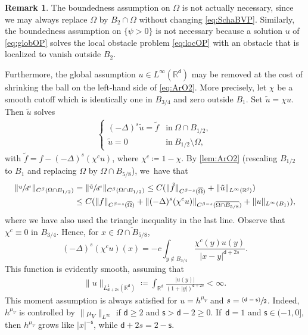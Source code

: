 \documentclass[JEP,XML,SOM,Unicode,published]{cedram}
\newcommand{\psfrac}[2]{\sfrac{(#1)}{#2}}
\theoremstyle{plain}
\theoremstyle{definition}
\newtheorem{remark}[thm]{Remark}
\newcommand{\R}{{\mathbb{R}}}
\let\be\beta
\let\ol\overline
\let\tl\tilde
\renewcommand{\d}{\mathsf{d}}
\newcommand{\s}{\mathsf{s}}
\begin{document}
\begin{remark}\label{rem:ArO2}
The boundedness assumption on $\Omega$ is not actually necessary, since we may always replace $\Omega$ by $B_2\cap \Omega$ without changing \eqref{eq:SchaBVP}. Similarly, the boundedness assumption on $\{\psi>0\}$ is not necessary because a solution $u$ of \eqref{eq:globOP} solves the local obstacle problem \eqref{eq:locOP} with an obstacle that is localized to vanish outside $B_2$.

Furthermore, the global assumption ${u\in L^\infty(\R^\d)}$ may be removed at the cost of shrinking the ball on the left-hand side {of \eqref{eq:ArO2}}. More precisely, let $\chi$ be a smooth cutoff which is identically one in $B_{3/4}$ and zero outside $B_1$. Set $\tl u = \chi u$. Then $\tl{u}$ solves
\begin{equation}
\begin{aligned}\label{eq:SchaBVP'}
\begin{cases}
(-\Delta)^s\tl{u} = \tl{f} & \text{in} \ \Omega\cap B_{1/2},\\
\tl{u} = 0 & \text{in} \ B_{1/2}\setminus\Omega,
\end{cases}
\end{aligned}
\end{equation}
with $\tl{f} = f - (-\Delta)^s(\chi^c u)$, where $\chi^c \coloneqq 1-\chi$. By \cref{lem:ArO2} (rescaling $B_{1/2}$ to $B_1$ and replacing $\Omega$ by $\Omega\cap B_{5/8}$), we~have that
\begin{align*}
\|\sfrac{u}{d^s}\|_{C^\be({\Omega}\cap B_{1/2})} &= \|\sfrac{\tl{u}}{d^s}\|_{C^\be({\Omega}\cap B_{1/2})} \le C(\|\tl{f}\|_{C^{\be-s}(\ol\Omega)} + \|\tl{u}\|_{L^\infty(\R^\d)})\\
&\le C(\|f\|_{C^{\be-s}(\ol\Omega)} + \|(-\Delta)^s(\chi^c u)\|_{C^{\be-s}(\ol{\Omega \cap B_{5/8}})} + \|u\|_{L^\infty(B_1)}),
\end{align*}
where we have also used the triangle inequality in the last line. Observe that $\chi^c \equiv 0$ in $B_{3/4}$. Hence, for $x\in \ol{\Omega \cap B_{5/8}}$,
\begin{equation}\label{eq:Deltaschic}
(-\Delta)^s(\chi^c u)(x) = -c\int_{y\notin B_{3/4}} \frac{\chi^c(y)u(y)}{|x-y|^{\d+2s}}.
\end{equation}
This function is evidently smooth, assuming that
\begin{align*}
\|u\|_{L_{\d+2s}^1(\R^\d)} \coloneqq \int_{\R^\d}\frac{|u(y)|}{(1+|y|)^{\d+2s}}<\infty.
\end{align*}
{This moment assumption is always satisfied for $u=h^{\mu_V}$ and $s=\psfrac{\d-\s}{2}$. Indeed, $h^{\mu_V}$ is controlled by $\|\mu_V\|_{L^\infty}$ if $\d\ge 2$ and $\s>\d-2\ge 0$. If~$\d=1$ and $\s \in (-1,0]$, then $h^{\mu_V}$ grows like $|x|^{-\s}$, while $\d+2s = 2-\s$.}
\end{remark}
\end{document}
